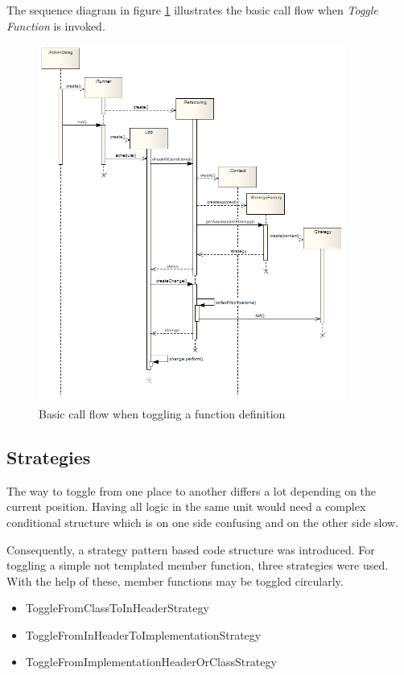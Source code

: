 The sequence diagram in figure \ref{sd} illustrates the basic call flow when 
\textit{Toggle Function} is invoked.
\begin{figure}[h]
  \centering
  \includegraphics[width=0.9\textwidth]{images/sequence_diagram.png}
  \caption{Basic call flow when toggling a function definition}
  \label{sd}
\end{figure}

\subsection{Strategies}

The way to toggle from one place to another differs a lot depending on
the current position. Having all logic in the same unit would need a complex
conditional structure which is on one side confusing and on the other side
slow.

Consequently, a strategy pattern based code structure was introduced. For
toggling a simple not templated member function, three strategies were used.
With the help of these, member functions may be toggled circularly.

\begin{itemize}
\item ToggleFromClassToInHeaderStrategy
\item ToggleFromInHeaderToImplementationStrategy
\item ToggleFromImplementationHeaderOrClassStrategy
\end{itemize}

